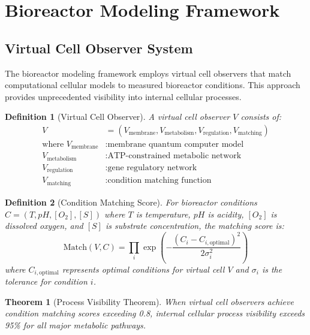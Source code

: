 \documentclass[12pt,a4paper]{article}
\newtheorem{theorem}{Theorem}
\newtheorem{definition}{Definition}
\begin{document}
\section{Bioreactor Modeling Framework}

\subsection{Virtual Cell Observer System}

The bioreactor modeling framework employs virtual cell observers that match computational cellular models to measured bioreactor conditions. This approach provides unprecedented visibility into internal cellular processes.

\begin{definition}[Virtual Cell Observer]
A virtual cell observer $V$ consists of:
\begin{align}
V &= (V_{\text{membrane}}, V_{\text{metabolism}}, V_{\text{regulation}}, V_{\text{matching}}) \\
\text{where } V_{\text{membrane}} &: \text{membrane quantum computer model} \\
V_{\text{metabolism}} &: \text{ATP-constrained metabolic network} \\
V_{\text{regulation}} &: \text{gene regulatory network} \\
V_{\text{matching}} &: \text{condition matching function}
\end{align}
\end{definition}

\begin{definition}[Condition Matching Score]
For bioreactor conditions $C = (T, pH, [O_2], [S])$ where $T$ is temperature, $pH$ is acidity, $[O_2]$ is dissolved oxygen, and $[S]$ is substrate concentration, the matching score is:
\begin{equation}
\text{Match}(V, C) = \prod_{i} \exp\left(-\frac{(C_i - C_{i,\text{optimal}})^2}{2\sigma_i^2}\right)
\end{equation}
where $C_{i,\text{optimal}}$ represents optimal conditions for virtual cell $V$ and $\sigma_i$ is the tolerance for condition $i$.
\end{definition}

\begin{theorem}[Process Visibility Theorem]
When virtual cell observers achieve condition matching scores exceeding 0.8, internal cellular process visibility exceeds 95\% for all major metabolic pathways.
\end{theorem}
\end{document}
